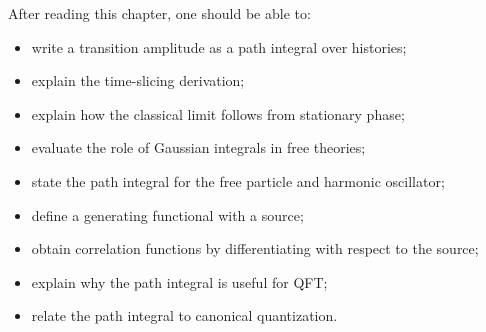 After reading this chapter, one should be able to:
\begin{itemize}
    \item write a transition amplitude as a path integral over histories;
    \item explain the time-slicing derivation;
    \item explain how the classical limit follows from stationary phase;
    \item evaluate the role of Gaussian integrals in free theories;
    \item state the path integral for the free particle and harmonic oscillator;
    \item define a generating functional with a source;
    \item obtain correlation functions by differentiating with respect to the
    source;
    \item explain why the path integral is useful for QFT;
    \item relate the path integral to canonical quantization.
\end{itemize}
